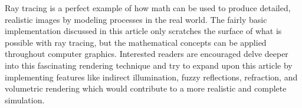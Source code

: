 Ray tracing is a perfect example of how math can be used to produce detailed, realistic images by modeling processes in the real world. The fairly basic implementation discussed in this article only scratches the surface of what is possible with ray tracing, but the mathematical concepts can be applied throughout computer graphics. Interested readers are encouraged delve deeper into this fascinating rendering technique and try to expand upon this article by implementing features like indirect illumination, fuzzy reflections, refraction, and volumetric rendering which would contribute to a more realistic and complete simulation.
